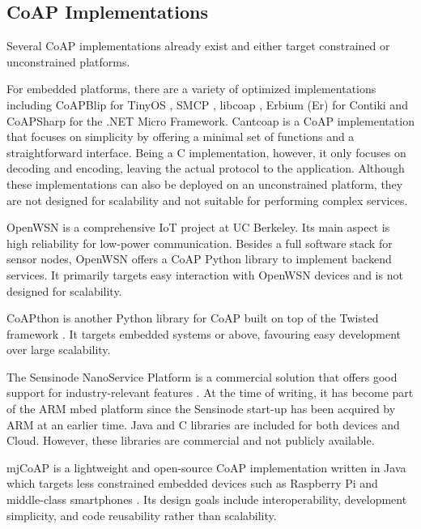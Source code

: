 \subsection{CoAP Implementations}\label{CoAP_imp}

Several CoAP implementations already exist and either target constrained or unconstrained platforms. 

For embedded platforms, there are a variety of optimized implementations including CoAPBlip for TinyOS \autocite{6208761}, SMCP \autocite{SMCP}, libcoap \autocite{kuladinithi2011implementation}, Erbium (Er) for Contiki \autocite{kovatsch2011low} and CoAPSharp \autocite{coapsharp} for the .NET Micro Framework. Cantcoap \autocite{cantcoap} is a CoAP implementation that focuses on simplicity by offering a minimal set of functions and a straightforward interface. Being a C implementation, however, it only focuses on decoding and encoding, leaving the actual protocol to the application. Although these implementations can also be deployed on an unconstrained platform, they are not designed for scalability and not suitable for performing complex services.

OpenWSN \autocite{open-wsn} is a comprehensive IoT project at UC Berkeley. Its main aspect is high reliability for low-power communication. Besides a full software stack for sensor nodes, OpenWSN offers a CoAP Python library \autocite{openwsn_python} to implement backend services. It primarily targets easy interaction with OpenWSN devices and is not designed for scalability.

CoAPthon \autocite{coapthon_code, 7389028} is another Python library for CoAP built on top of the Twisted framework \autocite{twisted}. It targets embedded systems or above, favouring easy development over large scalability. 

The Sensinode NanoService Platform is a commercial solution that offers good support for industry-relevant features \autocite{kovatsch2015scalable}. At the time of writing, it has become part of the ARM mbed platform \autocite{mbed} since the Sensinode start-up has been acquired by ARM at an earlier time. Java and C libraries are included for both devices and Cloud. However, these libraries are commercial and not publicly available. 

mjCoAP is a lightweight and open-source CoAP implementation written in Java which targets less constrained embedded devices such as Raspberry Pi and middle-class smartphones \autocite{cirani2015mjcoap}. Its design goals include interoperability, development simplicity, and code reusability rather than scalability.  

